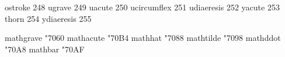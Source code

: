  ostroke           248
 ugrave            249
 uacute            250
 ucircumflex       251
 udiaeresis        252
 yacute            253
 thorn             254
 ydiaeresis        255
      
\stopencoding


\startencoding[texnansi]

 mathgrave       "7060 
 mathacute       "70B4 
 mathhat         "7088 
 mathtilde       "7098 
 mathddot        "70A8 
 mathbar         "70AF 

\stopencoding

\endinput

% 
% 
% 
% 
